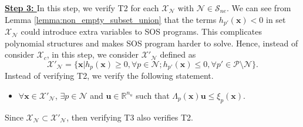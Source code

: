 \documentclass[letterpaper, 10 pt, conference]{ieeeconf}  %
\begin{document}
\textbf{\underline{Step 3: }} In this step, we verify T2 for each $\mathcal{X}_{\mathcal{N}}$ with $ \mathcal{N}\in\mathcal{S}_{ne}$. We can see from Lemma \ref{lemma:non_empty_subset_union} that the terms $h_{p'}(\mathbf{x})<0$ in set $\mathcal{X}_{\mathcal{N}}$ could introduce extra variables to SOS programs. This complicates polynomial structures and makes SOS program harder to solve. Hence, instead of consider $\mathcal{X}_c$, in this step, we consider $\mathcal{X}'_{\mathcal{N}}$ defined as
\begin{equation*}
    \mathcal{X}'_{\mathcal{N}} = \{\mathbf{x}|h_p(\mathbf{x})\geq0, \forall p\in\mathcal{N}; h_{p'}(\mathbf{x})\leq 0, \forall p'\in\mathcal{P}\setminus\mathcal{N}\}.
\end{equation*}
Instead of verifying T2, we verify the following statement.
\begin{itemize}
    \item [T3: ]$\forall \mathbf{x}\in\mathcal{X}'_{\mathcal{N}}$, $\exists p\in\mathcal{N}$ and $\mathbf{u}\in\mathbb{R}^{n_u}$ such that $\Lambda_p(\mathbf{x})\mathbf{u}\leq\xi_p(\mathbf{x})$.
\end{itemize}
Since $\mathcal{X}_{\mathcal{N}}\subset\mathcal{X}'_{\mathcal{N}}$, then verifying T3 also verifies T2. 
 
\end{document}
